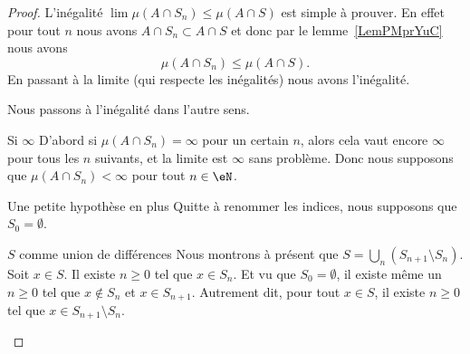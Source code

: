 \begin{proof}
	L'inégalité \( \lim\mu(A\cap S_n)\leq \mu(A\cap S)\) est simple à prouver. En effet pour tout \( n\) nous avons \( A\cap S_n\subset A\cap S\) et donc par le lemme~\ref{LemPMprYuC} nous avons
	\begin{equation}
		\mu(A\cap S_n)\leq\mu(A\cap S).
	\end{equation}
	En passant à la limite (qui respecte les inégalités) nous avons l'inégalité.

	Nous passons à l'inégalité dans l'autre sens.

	\begin{subproof}
		\item[Si \( \infty\)]
		D'abord si \( \mu(A\cap S_n)=\infty\) pour un certain \( n\), alors cela vaut encore \( \infty\) pour tous les \( n\) suivants, et la limite est \( \infty\) sans problème. Donc nous supposons que \( \mu(A\cap S_n)<\infty\) pour tout \( n\in \eN\).

		\item[Une petite hypothèse en plus]
		Quitte à renommer les indices, nous supposons que \( S_0=\emptyset\).

		\item[\( S\) comme union de différences]
		Nous montrons à présent que \( S=\bigcup_n(S_{n+1}\setminus S_n)\). Soit \( x\in S\). Il existe \( n\geq 0\) tel que \( x\in S_n\). Et vu que \( S_0=\emptyset\), il existe même un \( n\geq 0\) tel que \( x\notin S_n\) et \( x\in S_{n+1}\). Autrement dit, pour tout \( x\in S\), il existe \( n\geq 0\) tel que \( x\in S_{n+1}\setminus S_n\).


\end{subproof}
\end{proof}

